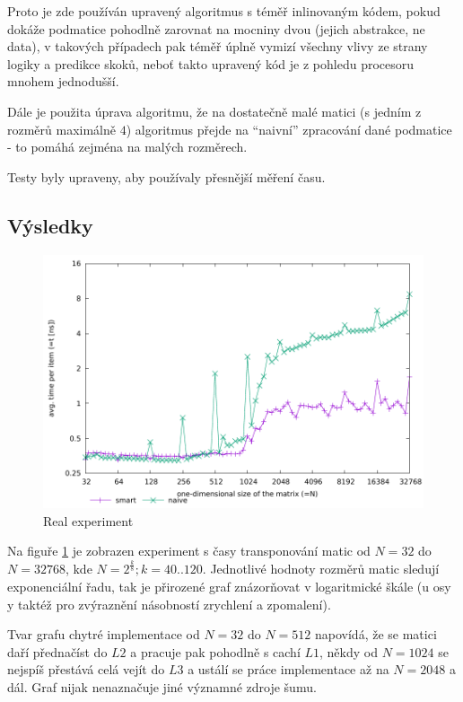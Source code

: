 \documentclass[a4paper,12pt]{article} %
\begin{document}
Proto je zde používán upravený algoritmus s téměř inlinovaným kódem, pokud dokáže podmatice pohodlně zarovnat na mocniny dvou (jejich abstrakce, ne data), v takových případech pak téměř úplně vymizí všechny vlivy ze strany logiky a predikce skoků, neboť takto upravený kód je z pohledu procesoru mnohem jednodušší.

Dále je použita úprava algoritmu, že na dostatečně malé matici (s jedním z rozměrů maximálně $4$) algoritmus přejde na ``naivní'' zpracování dané podmatice - to pomáhá zejména na malých rozměrech.

Testy byly upraveny, aby používaly přesnější měření času.

\subsection{Výsledky}

\begin{figure}[!hbt]
	\caption{Real experiment}
	\label{realgraph}
	\includegraphics{real.pdf}
\end{figure}

Na figuře \ref{realgraph} je zobrazen experiment s časy transponování matic od $N = 32$ do $N=32768$, kde $N=2^\frac{k}{8}; k = 40 .. 120$. Jednotlivé hodnoty rozměrů matic sledují exponenciální řadu, tak je přirozené graf znázorňovat v logaritmické škále (u osy y taktéž pro zvýraznění násobností zrychlení a zpomalení).

Tvar grafu chytré implementace od $N = 32$ do $N=512$  napovídá, že se matici daří přednačíst do $L2$ a pracuje pak pohodlně s cachí $L1$, někdy od $N=1024$ se nejspíš přestává celá vejít do $L3$ a ustálí se práce implementace až na $N=2048$ a dál. Graf nijak nenaznačuje jiné významné zdroje šumu.
\end{document}

